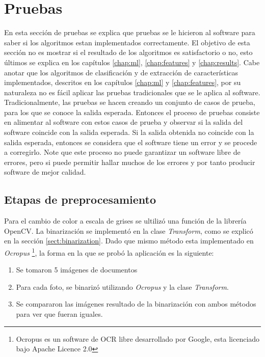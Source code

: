 \documentclass[a4paper, 11pt, oneside]{report}
\begin{document}
\section{Pruebas}

En esta sección de pruebas se explica que pruebas se le hicieron al software para saber si los algoritmos estan implementados correctamente. El objetivo de esta sección no es mostrar si el resultado de los algoritmos es satisfactorio o no, esto últimos se explica en los capítulos \ref{chap:ml}, \ref{chap:features} y \ref{chap:results}. Cabe anotar que los algoritmos de clasificación y de extracción de características implementados, descritos en los capítulos \ref{chap:ml} y \ref{chap:features}, por su naturaleza no es fácil aplicar las pruebas tradicionales que se le aplica al software.\newline \newline
Tradicionalmente, las pruebas se hacen creando un conjunto de casos de prueba, para los que se conoce la salida esperada. Entonces el proceso de pruebas consiste en alimentar al software con estos casos de prueba y observar si la salida del software coincide con la salida esperada. Si la salida obtenida no coincide con la salida esperada, entonces se considera que el software tiene un error y se procede a corregirlo. Note que este proceso no puede garantizar un software libre de errores, pero si puede permitir hallar muchos de los errores y por tanto producir software de mejor calidad.

\subsection{Etapas de preprocesamiento}
Para el cambio de color a escala de grises se ultilizó una función de la librería OpenCV. La binarización se implementó en la clase {\it Transform}, como se explicó en la sección \ref{sect:binarization}. Dado que mismo método esta implementado en {\it Ocropus} \footnote{Ocropus es un software de OCR libre desarrollado por Google, esta licenciado bajo Apache Licence 2.0}, la forma en la que se probó la aplicación es la siguiente:
\begin{enumerate}
\item Se tomaron 5 imágenes de documentos
\item Para cada foto, se binarizó utilizando {\it Ocropus} y la clase {\it Transform}.
\item Se compararon las imágenes resultado de la binarización con ambos métodos para ver que fueran iguales.
\end{enumerate}
\end{document}
